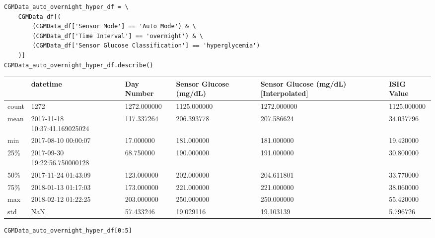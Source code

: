 \begin{verbatim}
CGMData_auto_overnight_hyper_df = \
    CGMData_df[(
        (CGMData_df['Sensor Mode'] == 'Auto Mode') & \
        (CGMData_df['Time Interval'] == 'overnight') & \
        (CGMData_df['Sensor Glucose Classification'] == 'hyperglycemia')
    )]
CGMData_auto_overnight_hyper_df.describe()
\end{verbatim}

\bigskip\noindent
\begin{tabular}{p{}p{}p{}p{}p{}p{}}
\toprule
 & datetime & Day Number & Sensor Glucose (mg/dL) & Sensor Glucose (mg/dL) [Interpolated] & ISIG Value \\
\hline
count & 1272 & 1272.000000 & 1125.000000 & 1272.000000 & 1125.000000 \\
\hline
mean & 2017-11-18 10:37:41.169025024 & 117.337264 & 206.393778 & 207.586624 & 34.037796 \\
\hline
min & 2017-08-10 00:00:07 & 17.000000 & 181.000000 & 181.000000 & 19.420000 \\
\hline
25\% & 2017-09-30 19:22:56.750000128 & 68.750000 & 190.000000 & 191.000000 & 30.800000 \\
\hline
50\% & 2017-11-24 01:43:09 & 123.000000 & 202.000000 & 204.611801 & 33.770000 \\
\hline
75\% & 2018-01-13 01:17:03 & 173.000000 & 221.000000 & 221.000000 & 38.060000 \\
\hline
max & 2018-02-12 01:22:25 & 203.000000 & 250.000000 & 250.000000 & 55.420000 \\
\hline
std & NaN & 57.433246 & 19.029116 & 19.103139 & 5.796726 \\
\hline
\bottomrule
\end{tabular}

\bigskip

\begin{verbatim}
CGMData_auto_overnight_hyper_df[0:5]
\end{verbatim}


